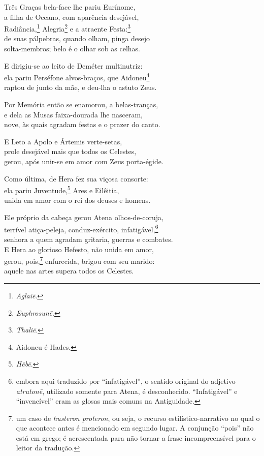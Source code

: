 \quad{}Três Graças bela-face lhe pariu Eurínome,\\
a filha de Oceano, com aparência desejável,\\
Radiância,\footnote{\emph{Aglaiē}.} Alegria\footnote{\emph{Euphrosunē}.} e a atraente Festa:\footnote{\emph{Thaliē}.}\\
de suas pálpebras, quando olham, pinga desejo \\
solta-membros; belo é o olhar sob as celhas.

\quad{}E dirigiu-se ao leito de Deméter multinutriz:\\
ela pariu Perséfone alvos-braços, que Aidoneu\footnote{Aidoneu é Hades.}\\
raptou de junto da mãe, e deu-lha o astuto Zeus.

\quad{}Por Memória então se enamorou, a belas-tranças, \\
e dela as Musas faixa-dourada lhe nasceram,\\
nove, às quais agradam festas e o prazer do canto.

\quad{}E Leto a Apolo e Ártemis verte-setas,\\
prole desejável mais que todos os Celestes,\\
gerou, após unir-se em amor com Zeus porta-égide. 

\quad{}Como última, de Hera fez sua viçosa consorte:\\
ela pariu Juventude,\footnote{\emph{Hēbē}.} Ares e Eilêitia,\\
unida em amor com o rei dos deuses e homens.

\quad{}Ele próprio da cabeça gerou Atena olhos-de-coruja,\\
terrível atiça-peleja, conduz-exército, infatigável,\footnote{embora aqui traduzido por ``infatigável'', o sentido original do
adjetivo \emph{atrutonē}, utilizado somente para Atena, é desconhecido.
``Infatigável'' e ``invencível'' eram as glosas mais comuns na
Antiguidade.}\\ 
senhora a quem agradam gritaria, guerras e combates.\\
E Hera ao glorioso Hefesto, não unida em amor,\\
gerou, pois,\footnote{um caso de \emph{husteron proteron}, ou seja, o recurso
estilístico-narrativo no qual o que acontece antes é mencionado em
segundo lugar. A conjunção ``pois'' não está em grego; é acrescentada
para não tornar a frase incompreensível para o leitor da tradução.} enfurecida, brigou com seu marido:\\
aquele nas artes supera todos os Celestes.

